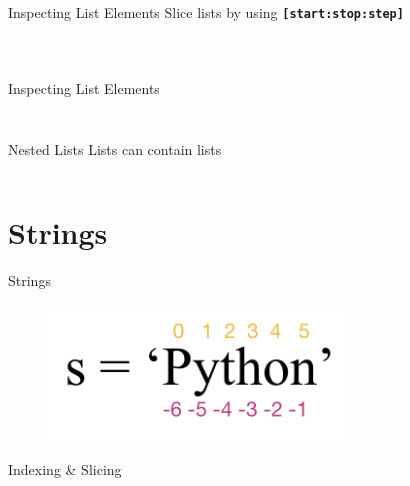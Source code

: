         \begin{frame}{Inspecting List Elements}
            Slice lists by using \texttt{\textbf{[start:stop:step]}}
            \begin{columns}
                \begin{column}{0.5\textwidth}
                \inputminted[frame=single,framesep=2pt]{python3}{code-examples/slicing.py} 
                \end{column}
               \pause 
                \begin{column}{0.5\textwidth}
                 \inputminted[frame=single,framesep=2pt]{python3}{code-examples/slicing2.py}
                \end{column} 
             \end{columns}
        \end{frame}
        \begin{frame}{Inspecting List Elements}
            \inputminted[frame=single,framesep=2pt]{python3}{code-examples/slicing3.py}
            \pause 
            \inputminted[frame=single,framesep=2pt]{python3}{code-examples/slicing4.py}
        \end{frame}
        \begin{frame}{Nested Lists}
            Lists can contain lists
            \bigskip
            \bigskip
            \inputminted[frame=single,framesep=2pt]{python3}{code-examples/nestedlists.py}
        \end{frame}

    \section{Strings}
        \begin{frame}{Strings}
            \begin{figure}[H]
                \centering
                \includegraphics[width=80mm]{code-examples/string.png}
                \end{figure}
        \end{frame}

        \begin{frame}{Indexing \& Slicing}
            \begin{columns}
                \begin{column}{0.5\textwidth}
                    \inputminted[frame=single,framesep=2pt]{python3}{code-examples/string_index.py}
                \end{column}
               \pause 
                \begin{column}{0.5\textwidth}
                    \inputminted[frame=single,framesep=2pt]{python3}{code-examples/string_index2.py}
                \end{column} 
            \end{columns}
        \end{frame}

